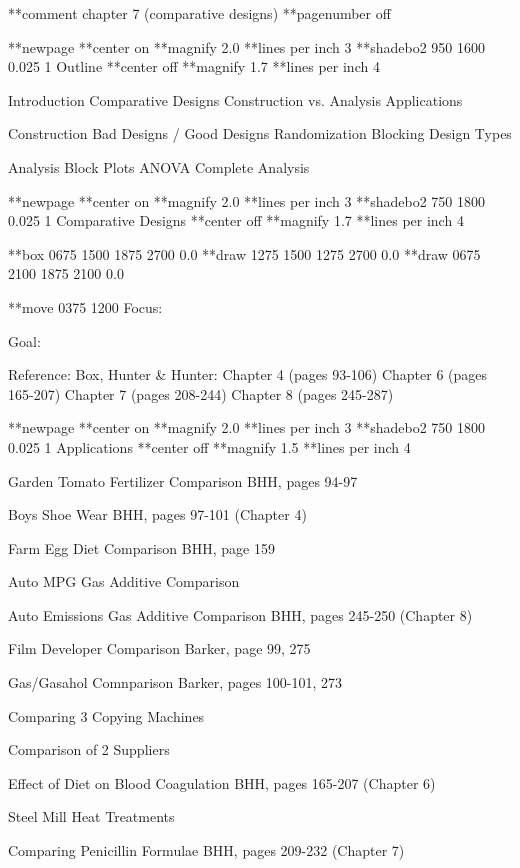 **comment chapter 7 (comparative designs)
**pagenumber off
 
**newpage
**center on
**magnify 2.0
**lines per inch 3
**shadebo2 950 1600 0.025 1
Outline
**center off
**magnify 1.7
**lines per inch 4
 
 
 
Introduction
      Comparative Designs
      Construction vs. Analysis
      Applications
 
Construction
      Bad Designs / Good Designs
      Randomization
      Blocking
      Design Types
 
Analysis
      Block Plots
      ANOVA
      Complete Analysis
 
**newpage
**center on
**magnify 2.0
**lines per inch 3
**shadebo2 750 1800 0.025 1
Comparative Designs
**center off
**magnify 1.7
**lines per inch 4
 
**box 0675 1500 1875 2700 0.0
**draw 1275 1500 1275 2700 0.0
**draw 0675 2100 1875 2100 0.0
 
 
**move 0375 1200
Focus:
 
Goal:
 
 
 
Reference: Box, Hunter & Hunter:
      Chapter 4 (pages 93-106)
      Chapter 6 (pages 165-207)
      Chapter 7 (pages 208-244)
      Chapter 8 (pages 245-287)
 
**newpage
**center on
**magnify 2.0
**lines per inch 3
**shadebo2 750 1800 0.025 1
Applications
**center off
**magnify 1.5
**lines per inch 4
 
 
Garden Tomato Fertilizer Comparison
BHH, pages 94-97
 
Boys Shoe Wear
BHH, pages 97-101 (Chapter 4)
 
Farm Egg Diet Comparison
BHH, page 159
 
Auto MPG Gas Additive Comparison
 
Auto Emissions Gas Additive Comparison
BHH, pages 245-250 (Chapter 8)
 
Film Developer Comparison
Barker, page 99, 275
 
Gas/Gasahol Comnparison
Barker, pages 100-101, 273
 
Comparing 3 Copying Machines
 
Comparison of 2 Suppliers
 
Effect of Diet on Blood Coagulation
BHH, pages 165-207 (Chapter 6)
 
Steel Mill Heat Treatments
 
Comparing Penicillin Formulae
BHH, pages 209-232 (Chapter 7)
 
